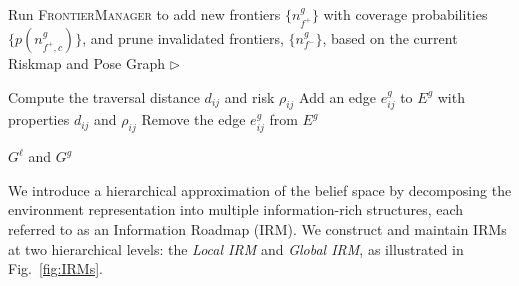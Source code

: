 \documentclass[letterpaper]{article} %
\begin{document}
\begin{algorithm}[t!]
{\begin{algorithmic}
  \STATE Run \textsc{FrontierManager} to add new frontiers $\{n^g_{f^+}\}$ with coverage probabilities $\{p(n^g_{f^+,c})\}$, and prune invalidated frontiers, $\{n^g_{f^-}\}$, based on the current Riskmap and Pose Graph
  \STATE \hspace{4.5cm} $\triangleright$ \cite{keidar2012robot}

      \STATE Compute the traversal distance $d_{ij}$ and risk $\rho_{ij}$
        \STATE Add an edge $e^g_{ij}$ to $E^g$ with properties $d_{ij}$ and $\rho_{ij}$
      \ELSE
        \STATE Remove the edge $e^g_{ij}$ from $E^g$
      \ENDIF
    \ENDFOR
  \ENDFOR



  \vspace{3pt}
  \RETURN $G^\ell$ and $G^g$

\end{algorithmic}
} %
\end{algorithm}

\noindent
We introduce a hierarchical approximation of the belief space by decomposing the environment representation into multiple information-rich structures, each referred to as an Information Roadmap (IRM). 
We construct and maintain IRMs at two hierarchical levels: the \textit{Local IRM} and \textit{Global IRM}, as illustrated in Fig.~\ref{fig:IRMs}. 
\end{document}
